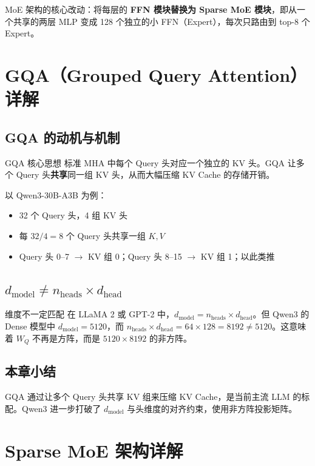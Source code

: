 \documentclass[a4paper]{article}
\begin{document}
MoE 架构的核心改动：将每层的 \textbf{FFN 模块替换为 Sparse MoE 模块}，即从一个共享的两层 MLP 变成 128 个独立的小 FFN（Expert），每次只路由到 top-8 个 Expert。

\section{GQA（Grouped Query Attention）详解}

\subsection{GQA 的动机与机制}

\begin{importantbox}{GQA 核心思想}
标准 MHA 中每个 Query 头对应一个独立的 KV 头。GQA 让多个 Query 头\textbf{共享}同一组 KV 头，从而大幅压缩 KV Cache 的存储开销。
\end{importantbox}

以 Qwen3-30B-A3B 为例：
\begin{itemize}
  \item 32 个 Query 头，4 组 KV 头
  \item 每 $32 / 4 = 8$ 个 Query 头共享一组 $K, V$
  \item Query 头 0--7 $\to$ KV 组 0；Query 头 8--15 $\to$ KV 组 1；以此类推
\end{itemize}

\subsection{$d_{\text{model}} \neq n_{\text{heads}} \times d_{\text{head}}$}

\begin{warningbox}{维度不一定匹配}
在 LLaMA 2 或 GPT-2 中，$d_{\text{model}} = n_{\text{heads}} \times d_{\text{head}}$。但 Qwen3 的 Dense 模型中 $d_{\text{model}} = 5120$，而 $n_{\text{heads}} \times d_{\text{head}} = 64 \times 128 = 8192 \neq 5120$。这意味着 $W_Q$ 不再是方阵，而是 $5120 \times 8192$ 的非方阵。
\end{warningbox}

\subsection{本章小结}

GQA 通过让多个 Query 头共享 KV 组来压缩 KV Cache，是当前主流 LLM 的标配。Qwen3 进一步打破了 $d_{\text{model}}$ 与头维度的对齐约束，使用非方阵投影矩阵。

\section{Sparse MoE 架构详解}
\end{document}
